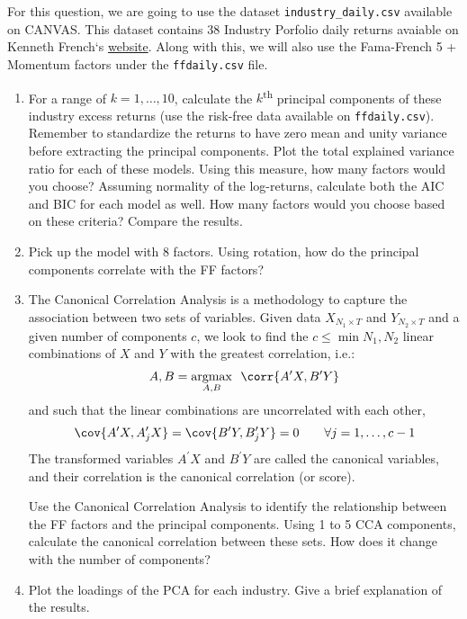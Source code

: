 For this question, we are going to use the dataset \texttt{industry\_daily.csv} available on CANVAS. This dataset contains 38 Industry Porfolio daily returns avaiable on Kenneth French`s \href{http://mba.tuck.dartmouth.edu/pages/faculty/ken.french/data_library.html}{website}. Along with this, we will also use the Fama-French 5 + Momentum factors under the \texttt{ffdaily.csv} file.

\begin{enumerate}[label = \Alph*)]
    \item For a range of \(k = 1, \dots, 10\), calculate the \(k\)\textsuperscript{th} principal components of these industry excess returns (use the risk-free data available on \texttt{ffdaily.csv}). Remember to standardize the returns to have zero mean and unity variance before extracting the principal components. Plot the total explained variance ratio for each of these models. Using this measure, how many factors would you choose? Assuming normality of the log-returns, calculate both the AIC and BIC for each model as well. How many factors would you choose based on these criteria? Compare the results.
    \item Pick up the model with 8 factors. Using rotation, how do the principal components correlate with the FF factors? 
    \item The Canonical Correlation Analysis is a methodology to capture the association between two sets of variables. Given data \(X_{N_1 \times T}\) and \(Y_{N_2 \times T}\) and a given number of components \(c\), we look to find the \(c \leq \min{N_1, N_2}\) linear combinations of \(X\) and \(Y\) with the greatest correlation, i.e.:
    \begin{equation}
        A, B = \argmax_{A, B}\hspace{5pt}\corr{A^\prime X, B^\prime Y}
    \end{equation}
    and such that the linear combinations are uncorrelated with each other,
    \[
        \cov{A^\prime X, A_j^\prime X} = \cov{B^\prime Y, B_j^\prime Y} = 0 \qquad \forall j = 1, \dots, c - 1
    \]
    The transformed variables \(A^\prime X\) and \(B^\prime Y\) are called the canonical variables, and their correlation is the canonical correlation (or score).

    Use the Canonical Correlation Analysis to identify the relationship between the FF factors and the principal components. Using 1 to 5 CCA components, calculate the canonical correlation between these sets. How does it change with the number of components?
    \item Plot the loadings of the PCA for each industry. Give a brief explanation of the results. 
\end{enumerate}